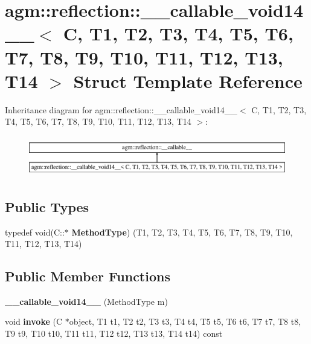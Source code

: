 \hypertarget{structagm_1_1reflection_1_1____callable__void14____}{}\section{agm\+:\+:reflection\+:\+:\+\_\+\+\_\+callable\+\_\+void14\+\_\+\+\_\+$<$ C, T1, T2, T3, T4, T5, T6, T7, T8, T9, T10, T11, T12, T13, T14 $>$ Struct Template Reference}
\label{structagm_1_1reflection_1_1____callable__void14____}
Inheritance diagram for agm\+:\+:reflection\+:\+:\+\_\+\+\_\+callable\+\_\+void14\+\_\+\+\_\+$<$ C, T1, T2, T3, T4, T5, T6, T7, T8, T9, T10, T11, T12, T13, T14 $>$\+:\begin{figure}[H]
\begin{center}
\leavevmode
\includegraphics[height=1.821138cm]{structagm_1_1reflection_1_1____callable__void14____}
\end{center}
\end{figure}
\subsection*{Public Types}
\begin{DoxyCompactItemize}
\item 
typedef void(C\+::$\ast$ {\bfseries Method\+Type}) (T1, T2, T3, T4, T5, T6, T7, T8, T9, T10, T11, T12, T13, T14)\hypertarget{structagm_1_1reflection_1_1____callable__void14_____a825d0c2f4e06187f792dcfbb708e3f53}{}\label{structagm_1_1reflection_1_1____callable__void14_____a825d0c2f4e06187f792dcfbb708e3f53}

\end{DoxyCompactItemize}
\subsection*{Public Member Functions}
\begin{DoxyCompactItemize}
\item 
{\bfseries \+\_\+\+\_\+callable\+\_\+void14\+\_\+\+\_\+} (Method\+Type m)\hypertarget{structagm_1_1reflection_1_1____callable__void14_____a2eb04a9701227bc16569d76e582c8330}{}\label{structagm_1_1reflection_1_1____callable__void14_____a2eb04a9701227bc16569d76e582c8330}

\item 
void {\bfseries invoke} (C $\ast$object, T1 t1, T2 t2, T3 t3, T4 t4, T5 t5, T6 t6, T7 t7, T8 t8, T9 t9, T10 t10, T11 t11, T12 t12, T13 t13, T14 t14) const \hypertarget{structagm_1_1reflection_1_1____callable__void14_____a8893ada9975e99f782d5afe66e0d857e}{}\label{structagm_1_1reflection_1_1____callable__void14_____a8893ada9975e99f782d5afe66e0d857e}

\end{DoxyCompactItemize}
